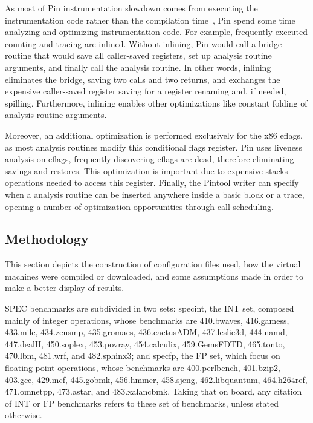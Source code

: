 \documentclass[11pt,twoside]{article}
\begin{document}
  As most of Pin instrumentation slowdown comes from executing
  the instrumentation code rather than the compilation
  time~\cite{pin}, Pin spend some time analyzing and optimizing
  instrumentation code.
  For example, frequently-executed counting and tracing are
  inlined. Without inlining, Pin would call a bridge routine
  that would save all caller-saved registers, set up analysis
  routine arguments, and finally call the analysis routine.
  In other words, inlining eliminates the bridge, saving two calls
  and two returns, and exchanges the expensive caller-saved register
  saving for a register renaming and, if needed, spilling.
  Furthermore, inlining enables other optimizations like
  constant folding of analysis routine arguments.

  Moreover, an additional optimization is performed exclusively
  for the x86 eflags, as most analysis routines modify this
  conditional flags register. Pin uses liveness analysis on
  eflags, frequently discovering eflags are dead, therefore
  eliminating savings and restores.
  This optimization is important
  due to expensive stacks operations needed to access this register.
  Finally, the Pintool writer can specify when a analysis routine
  can be inserted anywhere inside a basic block or a trace,
  opening a number of optimization opportunities
  through call scheduling.

\subsection{Methodology}
  \label{sec:methodology}

  This section depicts the construction of configuration files
  used, how the virtual machines were compiled or downloaded,
  and some assumptions made in order to make a better display
  of results.

  SPEC benchmarks are subdivided in two sets:
  	specint, the INT set, composed mainly of integer operations,
	whose benchmarks are
		410.bwaves,
        416.gamess,
        433.milc,
        434.zeusmp,
        435.gromacs,
        436.cactusADM,
        437.leslie3d,
        444.namd,
        447.dealII,
        450.soplex,
        453.povray,
        454.calculix,
        459.GemsFDTD,
        465.tonto,
        470.lbm,
        481.wrf, and
        482.sphinx3;
	and specfp, the FP set, which focus on floating-point operations,
	whose benchmarks are
		400.perlbench,
        401.bzip2,
        403.gcc,
        429.mcf,
        445.gobmk,
        456.hmmer,
        458.sjeng,
        462.libquantum,
        464.h264ref,
        471.omnetpp,
        473.astar, and
        483.xalancbmk.
  Taking that on board, any citation of INT or FP benchmarks
  refers to these set of benchmarks, unless stated otherwise.
\end{document}
